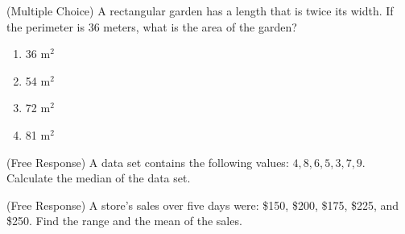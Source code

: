\documentclass[12pt]{article}
\begin{document}
  \item (Multiple Choice) A rectangular garden has a length that is twice its width. If the perimeter is 36 meters, what is the area of the garden?
    \begin{enumerate}[label=(\Alph*)]
      \item 36 m\(^2\)
      \item 54 m\(^2\)
      \item 72 m\(^2\)
      \item 81 m\(^2\)
    \end{enumerate}
    
  \item (Free Response) A data set contains the following values: \(4, 8, 6, 5, 3, 7, 9\). Calculate the median of the data set.
    
  \item (Free Response) A store's sales over five days were: \$150, \$200, \$175, \$225, and \$250. Find the range and the mean of the sales.

\newpage
\end{document}
